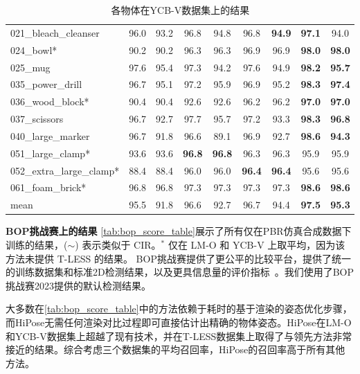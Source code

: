 \begin{table}
{\begin{tabular}{@{}l|c|c|c|c|c|c|c|c@{}}
       021\_bleach\_cleanser  & 96.0&  93.2& 96.8 &94.8& 96.8& \textbf{94.9}            &\textbf{97.1}&	94.0\\
       024\_bowl*             & 90.2 &  90.2& 96.3& 96.3& 96.9& 96.9           &\textbf{98.0}	&\textbf{98.0}\\
       025\_mug               & 97.6&  95.4& 97.3& 94.2& 97.6& 94.9         & \textbf{98.2}	&\textbf{95.7}\\
       035\_power\_drill      & 96.7&  95.1& 97.2& 95.9& 96.9& 95.2           & \textbf{98.3}&	\textbf{97.4}\\
       036\_wood\_block*      & 90.4&  90.4& 92.6& 92.6& 96.2& 96.2           & \textbf{97.0}	&\textbf{97.0}\\
       037\_scissors          & 96.7&  92.7& 97.7& 95.7& 97.2& 93.3            &\textbf{98.3}&	\textbf{96.8}\\
       040\_large\_marker     & 96.7&  91.8& 96.6& 89.1& 96.9 &92.7          & \textbf{98.6}	&\textbf{94.3}\\
       051\_large\_clamp*     & 93.6&  93.6&  \textbf{96.8}& \textbf{96.8}& 96.3 &96.3          & 95.9&	95.9\\
       052\_extra\_large\_clamp* & 88.4&  88.4& 96.0& 96.0 &\textbf{96.4}& \textbf{96.4}         & 95.6&	95.6\\
       061\_foam\_brick*          & 96.8&  96.8& 97.3& 97.3& 97.3 &97.3       & \textbf{98.6}	&\textbf{98.6}\\
       \hline
       mean & 95.5&  91.8&  96.6 &92.7& 96.7 &94.4             &\textbf{97.5} &\textbf{95.3} \\
      \bottomrule
    \end{tabular}
    }
    \caption{各物体在YCB-V数据集上的结果}
    \label{tab:ycbv_full_results_AUC}
\end{table}

\textbf{BOP挑战赛上的结果 } \autoref{tab:bop_score_table}展示了所有仅在PBR仿真合成数据下训练的结果，($\sim$) 表示类似于 CIR\cite{lipson2022coupled}。$^*$ 仅在 LM-O 和 YCB-V 上取平均，因为该方法未提供 T-LESS 的结果。 BOP挑战赛提供了更公平的比较平台，提供了统一的训练数据集和标准2D检测结果，以及更具信息量的评价指标~\cite{hodan2018bop}。我们使用了BOP挑战赛2023提供的默认检测结果。



大多数在\autoref{tab:bop_score_table}中的方法依赖于耗时的基于渲染的姿态优化步骤，而HiPose无需任何渲染对比过程即可直接估计出精确的物体姿态。HiPose在LM-O和YCB-V数据集上超越了现有技术，并在T-LESS数据集上取得了与领先方法非常接近的结果。综合考虑三个数据集的平均召回率，HiPose的召回率高于所有其他方法。

